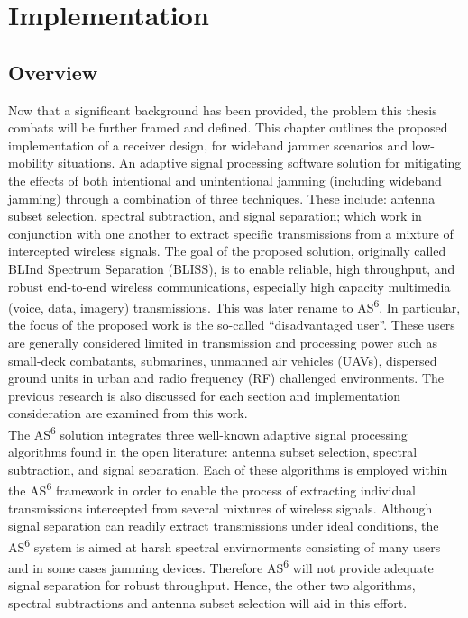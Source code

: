 \chapter{Implementation}
\label{ch:implementation}

\section{Overview}

Now that a significant background has been provided, the problem this thesis combats will be further framed and defined.  This chapter outlines the proposed implementation of a receiver design, for wideband jammer scenarios and low-mobility situations.  An adaptive signal processing software solution for mitigating the effects of both intentional and unintentional jamming (including wideband jamming) through a combination of three techniques.  These include: antenna subset selection, spectral subtraction, and signal separation; which work in conjunction with one another to extract specific transmissions from a mixture of intercepted wireless signals. The goal of the proposed solution, originally called BLInd Spectrum Separation (BLISS), is to enable reliable, high throughput, and robust end-to-end wireless communications, especially high capacity multimedia (voice, data, imagery) transmissions. This was later rename to AS\textsuperscript{6}.  In particular, the focus of the proposed work is the so-called ``disadvantaged user''.  These users are generally considered limited in transmission and processing power such as small-deck combatants, submarines, unmanned air vehicles (UAVs), dispersed ground units in urban and radio frequency (RF) challenged environments.  The previous research is also discussed for each section and implementation consideration are examined from this work.\\

The AS\textsuperscript{6} solution integrates three well-known adaptive signal processing algorithms found in the open literature: antenna subset selection, spectral subtraction, and signal separation. Each of these algorithms is employed within the AS\textsuperscript{6} framework in order to enable the process of extracting individual transmissions intercepted from several mixtures of wireless signals. Although signal separation can readily extract transmissions under ideal conditions, the AS\textsuperscript{6} system is aimed at harsh spectral envirnorments consisting of many users and in some cases jamming devices. Therefore AS\textsuperscript{6} will not provide adequate signal separation for robust throughput.  Hence, the other two algorithms, spectral subtractions and antenna subset selection will aid in this effort.\\


